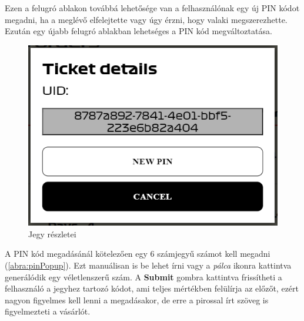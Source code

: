 Ezen a felugró ablakon továbbá lehetősége van a felhasználónak egy új PIN kódot megadni, ha a meglévő elfelejtette vagy úgy érzni, hogy valaki megszerezhette. Ezután egy újabb felugró ablakban lehetséges a PIN kód megváltoztatása. 

\begin{figure}[!h]
	\centering
	\includegraphics[scale=0.4]{images/moreDetails}
	\caption{Jegy részletei}
	\label{abra:moreDetails}
\end{figure}

A PIN kód megadásánál kötelezően egy 6 számjegyű számot kell megadni (\ref{abra:pinPopup}). Ezt manuálisan is be lehet írni vagy a \textit{pálca} ikonra kattintva generálódik egy véletlenszerű szám. A \textbf{Submit} gombra kattintva frissítheti a felhasználó a jegyhez tartozó kódot, ami teljes mértékben felülírja az előzőt, ezért nagyon figyelmes kell lenni a megadásakor, de erre a pirossal írt szöveg is figyelmezteti a vásárlót.

